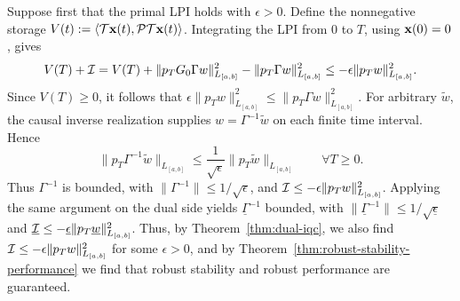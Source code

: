 Suppose first that the primal LPI holds with $\epsilon>0$. Define the
nonnegative storage $V(t):=\left\langle \mathcal{T}\mathbf{x}(t), \mathcal{P}\mathcal{T}\mathbf{x}(t) \right\rangle$.
Integrating the LPI from $0$ to $T$, using $\mathbf{x}(0)=0$, gives
\begin{equation}\label{eq:primal-storage-inverse-bound}
V(T)+\mathcal{I}
=V(T)+\|p_TG_0\Gamma w\|_{L_{[a,b]}}^2
-\|p_T\Gamma w\|_{L_{[a,b]}}^2
\leq-\epsilon\|p_Tw\|_{L_{[a,b]}}^2.
\end{equation}
Since $V(T)\geq0$, it follows that
$\epsilon\|p_Tw\|_{L_{[a,b]}}^2\leq\|p_T\Gamma w\|_{L_{[a,b]}}^2$.
For arbitrary $\tilde w$, the causal inverse realization supplies
$w=\Gamma^{-1}\tilde w$ on each finite time interval. Hence
\[
\|p_T\Gamma^{-1}\tilde w\|_{L_{[a,b]}}
\leq\frac{1}{\sqrt\epsilon}\|p_T\tilde w\|_{L_{[a,b]}}
\qquad\forall T\geq0.
\]
Thus $\Gamma^{-1}$ is bounded, with $\|\Gamma^{-1}\|\leq1/\sqrt\epsilon$,
and $\mathcal{I}\leq-\epsilon\|p_Tw\|_{L_{[a,b]}}^2$.
Applying the same argument on the dual side yields
$\underline\Gamma^{-1}$ bounded, with
$\|\underline\Gamma^{-1}\|\leq1/\sqrt{\underline \epsilon}$ and
$\underline{\mathcal{I}}\leq-\underline\epsilon\|p_T\underline w\|_{L_{[a,b]}}^2$.
Thus, by Theorem~\ref{thm:dual-iqc}, we also find
$\mathcal{I}\leq-\epsilon\|p_Tw\|_{L_{[a,b]}}^2$ for some $\epsilon>0$,
and by Theorem~\ref{thm:robust-stability-performance} we find that robust
stability and robust performance are guaranteed.
\par\endgroup
